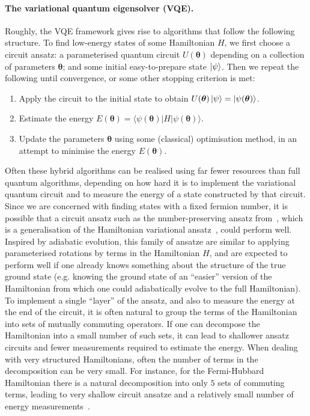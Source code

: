 \documentclass[11pt]{article}
\numberwithin{equation}{section}
\renewcommand\( {\left(}
\renewcommand\) {\right)}
\renewcommand{\braket}[1]{\langle #1 \rangle}
\begin{document}
\paragraph{The variational quantum eigensolver (VQE).} Roughly, the VQE framework gives rise to algorithms that follow the following structure. To find low-energy states of some Hamiltonian $H$, we first choose a circuit ansatz: a parameterised quantum circuit $U(\bm\theta)$ depending on a collection of parameters $\bm\theta$; and some initial easy-to-prepare state $\ket{\psi}$. Then we repeat the following until convergence, or some other stopping criterion is met:
\begin{enumerate}
    \item Apply the circuit to the initial state to obtain $U(\bm\theta)\ket{\psi} = \ket{\psi(\bm\theta)}$.
    \item Estimate the energy $E(\bm\theta) = \braket{\psi(\bm\theta)|H|\psi(\bm\theta)}$.
    \item Update the parameters $\bm\theta$ using some (classical) optimisation method, in an attempt to minimise the energy $E(\bm\theta)$.
\end{enumerate}

Often these hybrid algorithms can be realised using far fewer resources than full quantum algorithms, depending on how hard it is to implement the variational quantum circuit and to measure the energy of a state constructed by that circuit. Since we are concerned with finding states with a fixed fermion number, it is possible that a circuit ansatz such as the number-preserving ansatz from~\cite{cade2020strategies}, which is a generalisation of the Hamiltonian variational ansatz~\cite{wecker2015progress}, could perform well. Inspired by adiabatic evolution, this family of ansatze are similar to applying parameterised rotations by terms in the Hamiltonian $H$, and are expected to perform well if one already knows something about the structure of the true ground state (e.g. knowing the ground state of an ``easier'' version of the Hamiltonian from which one could adiabatically evolve to the full Hamiltonian). To implement a single ``layer'' of the ansatz, and also to measure the energy at the end of the circuit, it is often natural to group the terms of the Hamiltonian into sets of mutually commuting operators. If one can decompose the Hamiltonian into a small number of such sets, it can lead to shallower ansatz circuits and fewer measurements required to estimate the energy. When dealing with very structured Hamiltonians, often the number of terms in the decomposition can be very small. For instance, for the Fermi-Hubbard Hamiltonian there is a natural decomposition into only $5$ sets of commuting terms, leading to very shallow circuit ansatze and a relatively small number of energy measurements~\cite{cade2020strategies,cai2020resource}. 
\end{document}
